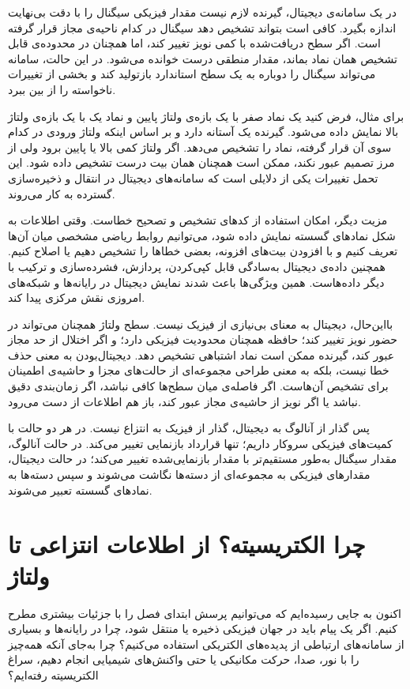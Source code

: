 در یک سامانه‌ی دیجیتال، گیرنده لازم نیست مقدار فیزیکی سیگنال را با دقت بی‌نهایت اندازه بگیرد. کافی است بتواند تشخیص دهد سیگنال در کدام ناحیه‌ی مجاز قرار گرفته است. اگر سطح دریافت‌شده با کمی نویز تغییر کند، اما همچنان در محدوده‌ی قابل تشخیص همان نماد بماند، مقدار منطقی درست خوانده می‌شود. در این حالت، سامانه می‌تواند سیگنال را دوباره به یک سطح استاندارد بازتولید کند و بخشی از تغییرات ناخواسته را از بین ببرد.

برای مثال، فرض کنید یک نماد صفر با یک بازه‌ی ولتاژ پایین و نماد یک با یک بازه‌ی ولتاژ بالا نمایش داده می‌شود. گیرنده یک آستانه دارد و بر اساس اینکه ولتاژ ورودی در کدام سوی آن قرار گرفته، نماد را تشخیص می‌دهد. اگر ولتاژ کمی بالا یا پایین برود ولی از مرز تصمیم عبور نکند، ممکن است همچنان همان بیت درست تشخیص داده شود. این تحمل تغییرات یکی از دلایلی است که سامانه‌های دیجیتال در انتقال و ذخیره‌سازی گسترده به کار می‌روند.

مزیت دیگر، امکان استفاده از کدهای تشخیص و تصحیح خطاست. وقتی اطلاعات به شکل نمادهای گسسته نمایش داده شود، می‌توانیم روابط ریاضی مشخصی میان آن‌ها تعریف کنیم و با افزودن بیت‌های افزونه، بعضی خطاها را تشخیص دهیم یا اصلاح کنیم. همچنین داده‌ی دیجیتال به‌سادگی قابل کپی‌کردن، پردازش، فشرده‌سازی و ترکیب با دیگر داده‌هاست. همین ویژگی‌ها باعث شدند نمایش دیجیتال در رایانه‌ها و شبکه‌های امروزی نقش مرکزی پیدا کند.

بااین‌حال، دیجیتال به معنای بی‌نیازی از فیزیک نیست. سطح ولتاژ همچنان می‌تواند در حضور نویز تغییر کند؛ حافظه همچنان محدودیت فیزیکی دارد؛ و اگر اختلال از حد مجاز عبور کند، گیرنده ممکن است نماد اشتباهی تشخیص دهد. دیجیتال‌بودن به معنی حذف خطا نیست، بلکه به معنی طراحی مجموعه‌ای از حالت‌های مجزا و حاشیه‌ی اطمینان برای تشخیص آن‌هاست. اگر فاصله‌ی میان سطح‌ها کافی نباشد، اگر زمان‌بندی دقیق نباشد یا اگر نویز از حاشیه‌ی مجاز عبور کند، باز هم اطلاعات از دست می‌رود.

پس گذار از آنالوگ به دیجیتال، گذار از فیزیک به انتزاع نیست. در هر دو حالت با کمیت‌های فیزیکی سروکار داریم؛ تنها قرارداد بازنمایی تغییر می‌کند. در حالت آنالوگ، مقدار سیگنال به‌طور مستقیم‌تر با مقدار بازنمایی‌شده تغییر می‌کند؛ در حالت دیجیتال، مقدارهای فیزیکی به مجموعه‌ای از دسته‌ها نگاشت می‌شوند و سپس دسته‌ها به نمادهای گسسته تعبیر می‌شوند.

\section{چرا الکتریسیته؟ از اطلاعات انتزاعی تا ولتاژ}
\label{sec:why-electricity}

اکنون به جایی رسیده‌ایم که می‌توانیم پرسش ابتدای فصل را با جزئیات بیشتری مطرح کنیم. اگر یک پیام باید در جهان فیزیکی ذخیره یا منتقل شود، چرا در رایانه‌ها و بسیاری از سامانه‌های ارتباطی از پدیده‌های الکتریکی استفاده می‌کنیم؟ چرا به‌جای آنکه همه‌چیز را با نور، صدا، حرکت مکانیکی یا حتی واکنش‌های شیمیایی انجام دهیم، سراغ الکتریسیته رفته‌ایم؟

